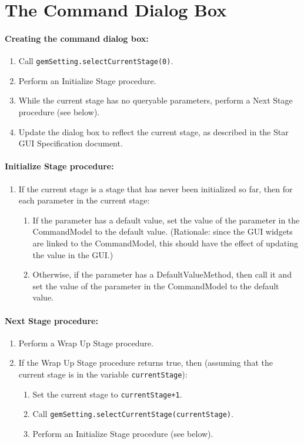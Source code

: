\documentclass[11pt]{article}
\begin{document}
\section{The Command Dialog Box}

\paragraph{Creating the command dialog box:}
\begin{enumerate}
\item Call {\tt gemSetting.selectCurrentStage(0)}.
\item Perform an Initialize Stage procedure.
\item While the current stage has no queryable parameters, perform
  a Next Stage procedure (see below).
\item Update the dialog box to reflect the current stage, as described
  in the Star GUI Specification document.
\end{enumerate}

\paragraph{Initialize Stage procedure:}
\begin{enumerate}
\item If the current stage is a stage that has never been initialized so far,
  then for each parameter in the current stage:
  \begin{enumerate}
  \item If the parameter has a default value, set the value of the
    parameter in the CommandModel to the default value.
    (Rationale:  since the GUI widgets are linked to the CommandModel,
    this should have the effect of updating the value in the GUI.)
  \item Otherwise, if the parameter has a DefaultValueMethod, then call it
    and set the value of the parameter in the CommandModel to the default
    value.
  \end{enumerate}
\end{enumerate}

\paragraph{Next Stage procedure:}
\begin{enumerate}
\item Perform a Wrap Up Stage procedure.
\item If the Wrap Up Stage procedure returns true, then (assuming
  that the current stage is in the variable {\tt currentStage}):
  \begin{enumerate}
  \item Set the current stage to \verb/currentStage+1/.
  \item Call {\tt gemSetting.selectCurrentStage(currentStage)}.
  \item Perform an Initialize Stage procedure (see below).
  \end{enumerate}
\end{enumerate}
\end{document}
